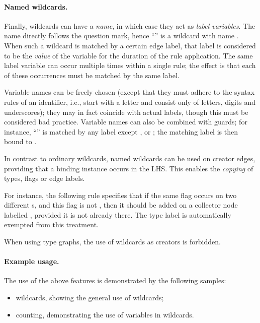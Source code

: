 \paragraph{Named wildcards.}

Finally, wildcards can have a \emph{name}, in which case they act as
\emph{label variables}. The name directly follows the question mark, hence
``'' is a wildcard with name . When such a wildcard is
matched by a certain edge label, that label is considered to be the
\emph{value} of the variable for the duration of the rule application. The same
label variable can occur multiple times within a single rule; the effect is
that each of these occurrences must be matched by the same label.

Variable names can be freely chosen (except that they must adhere to the syntax
rules of an identifier, i.e., start with a letter and consist only of letters,
digits and underscores); they may in fact coincide with actual labels, though
this must be considered bad practice. Variable names can also be combined with
guards; for instance, ``'' is matched by any label except
,  or ; the matching label is then bound to
.

In contrast to ordinary wildcards, named wildcards can be used on creator
edges, providing that a binding instance occurs in the LHS. This enables the
\emph{copying} of types, flags or edge labels.

For instance, the following rule specifies that if the same flag occurs on two
different s, and this flag is not , then it should be
added on a collector node labelled , provided it is not
already there. The type label  is automatically exempted from this
treatment.

%
When using type graphs, the use of wildcards as creators is forbidden.

\paragraph{Example usage.}

The use of the above features is demonstrated by the following \GROOVE samples:
%
\begin{itemize}\noitemsep
\item \textsf{wildcards}, showing the general use of wildcards;
\item \textsf{counting}, demonstrating the use of variables in wildcards.
\end{itemize}

